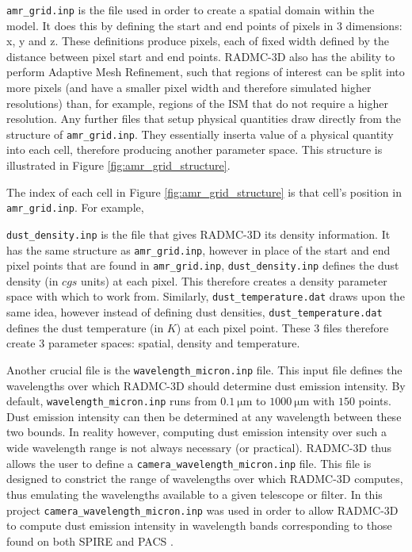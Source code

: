 \documentclass{report}
\begin{document}
\texttt{amr\_grid.inp} is the file used in order to create a spatial domain within the model. It does this by defining the start and end points of pixels in 3 dimensions: x, y and z. These definitions produce pixels, each of fixed width defined by the distance between pixel start and end points. RADMC-3D also has the ability to perform Adaptive Mesh Refinement, such that regions of interest can be split into more pixels (and have a smaller pixel width and therefore simulated higher resolutions) than, for example, regions of the ISM that do not require a higher resolution. Any further files that setup physical quantities draw directly from the structure of \texttt{amr\_grid.inp}. They essentially \textquotesingle insert\textquotesingle a value of a physical quantity into each cell, therefore producing another parameter space. This structure is illustrated in Figure \ref{fig:amr_grid_structure}.

The index of each cell in Figure \ref{fig:amr_grid_structure} is that cell's position in \texttt{amr\_grid.inp}. For example,

\texttt{dust\_density.inp} is the file that gives RADMC-3D its density information. It has the same structure as \texttt{amr\_grid.inp}, however in place of the start and end pixel points that are found in \texttt{amr\_grid.inp}, \texttt{dust\_density.inp} defines the dust density (in $cgs$ units) at each pixel. This therefore creates a density parameter space with which to work from. Similarly, \texttt{dust\_temperature.dat} draws upon the same idea, however instead of defining dust densities, \texttt{dust\_temperature.dat} defines the dust temperature (in $K$) at each pixel point. These 3 files therefore create 3 parameter spaces: spatial, density and temperature.

Another crucial file is the \texttt{wavelength\_micron.inp} file. This input file defines the wavelengths over which RADMC-3D should determine dust emission intensity. By default, \texttt{wavelength\_micron.inp} runs from $\SI{0.1}{\micro\meter}$ to $\SI{1000}{\micro\meter}$ with $150$ points. Dust emission intensity can then be determined at any wavelength between these two bounds. In reality however, computing dust emission intensity over such a wide wavelength range is not always necessary (or practical). RADMC-3D thus allows the user to define a \texttt{camera\_wavelength\_micron.inp} file. This file is designed to constrict the range of wavelengths over which RADMC-3D computes, thus emulating the wavelengths available to a given telescope or filter. In this project \texttt{camera\_wavelength\_micron.inp} was used in order to allow RADMC-3D to compute dust emission intensity in wavelength bands corresponding to those found on both SPIRE \parencite{SPIRE} and PACS \parencite{PACS}.
\end{document}

